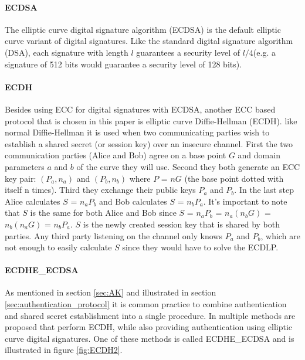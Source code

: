 \documentclass[11pt]{article}
\begin{document}
\paragraph{ECDSA} The elliptic curve digital signature algorithm (ECDSA) is the default elliptic curve variant of digital signatures. Like the standard digital signature algorithm (DSA), each signature with length $l$ guarantees a security level of $l/4$(e.g. a signature of 512 bits would guarantee a security level of 128 bits).

\paragraph{ECDH} Besides using ECC for digital signatures with ECDSA, another ECC based protocol that is chosen in this paper is elliptic curve Diffie-Hellman (ECDH). like normal Diffie-Hellman it is used when two communicating parties wish to establish a shared secret (or session key) over an insecure channel. First the two communication parties (Alice and Bob) agree on a base point $G$ and domain parameters $a$ and $b$ of the curve they will use. Second they both generate an ECC key pair: $(P_a,n_a)$ and $(P_b,n_b)$ where $P$ = $nG$ (the base point dotted with itself n times). Third they exchange their public keys $P_a$ and $P_b$. In the last step Alice calculates $S$ = $n_a P_b$ and Bob calculates $S$ = $n_b P_a$. It's important to note that $S$ is the same for both Alice and Bob since $S$ = $n_a P_b$ = $n_a ( n_b G )$ = $n_b ( n_a G )$ = $n_b P_a$. $S$ is the newly created session key that is shared by both parties. Any third party listening on the channel only knows $P_a$ and $P_b$, which are not enough to easily calculate $S$ since they would have to solve the ECDLP.

\paragraph{ECDHE\_ECDSA} As mentioned in section \ref{sec:AK} and illustrated in section \ref{sec:authentication_protocol} it is common practice to combine authentication and shared secret establishment into a single procedure. In \cite{RFC4492} multiple methods are proposed that perform ECDH, while also providing authentication using elliptic curve digital signatures. One of these methods is called ECDHE\_ECDSA and is illustrated in figure \ref{fig:ECDH2}. 
\end{document}
